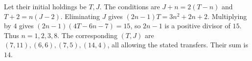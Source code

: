 Let their initial holdings be $T,J$. The conditions are $J+n=2(T-n)$ and $T+2=n(J-2)$. Eliminating $J$ gives $(2n-1)T=3n^2+2n+2$. Multiplying by $4$ gives $(2n-1)(4T-6n-7)=15$, so $2n-1$ is a positive divisor of $15$. Thus $n=1,2,3,8$. The corresponding $(T,J)$ are $(7,11),(6,6),(7,5),(14,4)$, all allowing the stated transfers. Their sum is $\boxed{14}$.
